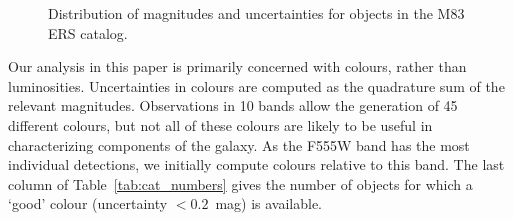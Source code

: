 \begin{figure}
\centering
{}
\hfill
{}
\caption{Distribution of magnitudes and uncertainties for objects in the \citet{chandar10} M83 ERS catalog.}
\label{fig:mag_unc}
\end{figure}

Our analysis in this paper is primarily concerned with colours, rather than luminosities.
Uncertainties in colours are computed as the quadrature sum of the relevant magnitudes.
Observations in 10 bands allow the generation of 45 different colours,
but not all of these colours are likely to be useful in characterizing components of the galaxy.
As the F555W band has the most individual detections, %
we initially compute colours relative to this band.
The last column of Table~\ref{tab:cat_numbers} gives the number of objects for which a `good' colour (uncertainty $<0.2$~mag) is available.





